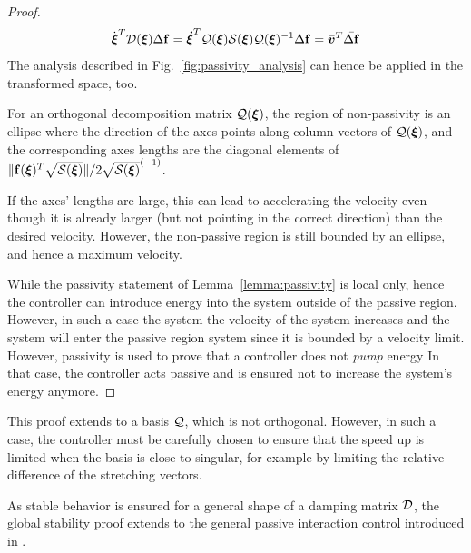 \begin{proof}
\begin{equation}
\dot{\boldsymbol{\xi}}^T \mathcal{D}({\boldsymbol{\xi}}) \Delta \mathbf{f} = \boldsymbol{\dot \xi}^T \mathcal{Q}({\boldsymbol{\xi}}) \mathcal{S}({\boldsymbol{\xi}}) \mathcal{Q}({\boldsymbol{\xi}})^{-1} \Delta \mathbf{f} = \boldsymbol{\bar v}^T \bar{\Delta \mathbf f}
\end{equation}
The analysis described in Fig.~\ref{fig:passivity_analysis} can hence be applied in the transformed space, too. 

For an orthogonal decomposition matrix $\mathcal{Q}(\boldsymbol{{\boldsymbol{\xi}}})$, the region of non-passivity is an ellipse where the direction of the axes points along column vectors of $\mathcal{Q}({\boldsymbol{\xi}})$, and the corresponding axes lengths are the diagonal elements of $\| \mathbf{f}({\boldsymbol{\xi}})^T \sqrt{\mathcal{S}({\boldsymbol{\xi}})}\| / 2 \sqrt{\mathcal{S}({\boldsymbol{\xi}})}^{(-1)}$. 

If the axes' lengths are large, this can lead to accelerating the velocity even though it is already larger (but not pointing in the correct direction) than the desired velocity. However, the non-passive region is still bounded by an ellipse, and hence a maximum velocity.

While the passivity statement of Lemma~\ref{lemma:passivity} is local only, hence the controller can introduce energy into the system outside of the passive region. However, in such a case the system the velocity of the system increases and the system will enter the passive region system since it is bounded by a velocity limit.
However, passivity is used to prove that a controller does not \textit{pump} energy In that case, the controller acts passive and is ensured not to increase the system's energy anymore.
\end{proof}

This proof extends to a basis $\mathcal{Q}$, which is not orthogonal. However, in such a case, the controller must be carefully chosen to ensure that the speed up is limited when the basis is close to singular, for example by limiting the relative difference of the stretching vectors.

As stable behavior is ensured for a general shape of a damping matrix $\mathcal{D}$, the global stability proof extends to the general passive interaction control introduced in \cite{kronander2015passive}.

